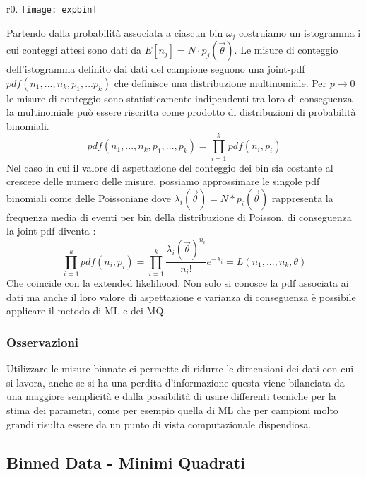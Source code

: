\begin{wrapfigure}{r}{0.\textwidth}
\centering
\texttt{[image: expbin]}	
\end{wrapfigure}
Partendo dalla probabilit\`{a} associata a ciascun bin $\omega_j$ costruiamo un istogramma i cui conteggi attesi sono dati da $ E[n_{j}] = N \cdot p_j(\vec{\theta})$. Le misure di conteggio dell'istogramma definito dai dati del campione seguono una joint-pdf $pdf(n_1,...,n_k,p_1,...p_k)$ che definisce una distribuzione multinomiale. Per $p \rightarrow 0 $ le misure di conteggio sono statisticamente indipendenti tra loro di conseguenza la multinomiale pu\`{o} essere riscritta come prodotto di distribuzioni di probabilit\`{a} binomiali.
\begin{equation*}
	pdf(n_1,...,n_k,p_1,...,p_k) = \prod_{i=1}^k pdf(n_i,p_i)
\end{equation*}
Nel caso in cui il valore di aspettazione del conteggio dei bin sia costante al crescere delle numero delle misure, possiamo approssimare le singole pdf binomiali come delle Poissoniane dove $\lambda_{i}(\vec{\theta}) = N * p_i(\vec{\theta})$ rappresenta la frequenza media di eventi per bin della distribuzione di Poisson, di conseguenza la joint-pdf diventa :
\begin{equation*}
	\prod_{i=1}^kpdf(n_i,p_i) = \prod_{i=1}^k \dfrac{\lambda_i(\vec{\theta})^{n_{i}}}{n_{i}!}e^{-\lambda_{i}} = L(n_1,...,n_k,\theta)
\end{equation*}
Che coincide con la extended likelihood.\newline
Non solo si conosce la pdf associata ai dati ma anche il loro valore di aspettazione e varianza di conseguenza \`{e} possibile applicare il metodo di ML e dei MQ.
\subsubsection{Osservazioni}

Utilizzare le misure binnate ci permette di ridurre le dimensioni dei dati con cui si lavora, anche se si ha una perdita d'informazione questa viene bilanciata da una maggiore semplicit\`{a} e dalla possibilit\`{a} di usare differenti tecniche per la stima dei parametri, come per esempio quella di ML che per campioni molto grandi risulta essere da un punto di vista computazionale dispendiosa.

\subsection{Binned Data - Minimi Quadrati}

